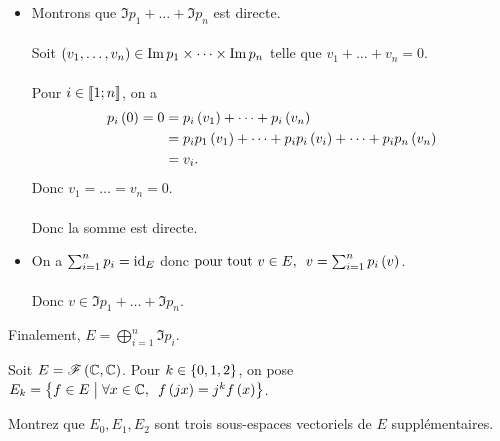\begin{dem}
\begin{itemize}
    \item Montrons que \(\Im p_1+\dots+\Im p_n\) est directe. \\\\ Soit \(\left(v_1,\dots,v_n\right)\in\operatorname{Im} p_1\times\dots\times\operatorname{Im} p_n\) telle que \(v_1+\dots+v_n=0\). \\\\ Pour \(i\in\left\llbracket1;n\right\rrbracket\), on a \[\begin{aligned}
        p_i\left(0\right)=0&=p_i\left(v_1\right)+\dots+p_i\left(v_n\right) \\
        &=p_ip_1\left(v_1\right)+\dots+p_ip_i\left(v_i\right)+\dots+p_ip_n\left(v_n\right) \\
        &=v_i. \\
    \end{aligned}\] Donc \(v_1=\dots=v_n=0\). \\\\ Donc la somme est directe. \\
    \item On a \(\sum_{i=1}^np_i=\mathrm{id}_{E}\) donc \(\quantifs{\tpt v\in E}v=\sum_{i=1}^np_i\paren{v}\). \\\\ Donc \(v\in\Im p_1+\dots+\Im p_n\).
\end{itemize}

Finalement, \(E=\bigoplus_{i=1}^n\Im p_i\).
\end{dem}

\begin{exo}
Soit \(E=\mathscr{F}\left(\mathbb{C},\mathbb{C}\right)\). Pour \(k\in\left\lbrace0,1,2\right\rbrace\), on pose \(E_k=\accol{f\in E\tq\quantifs{\forall x\in\C}f\paren{jx}=j^kf\paren{x}}\).

Montrez que \(E_0,E_1,E_2\) sont trois sous-espaces vectoriels de \(E\) supplémentaires.
\end{exo}

